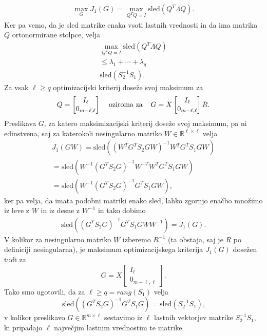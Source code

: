 \documentclass[mat1]{article}
\theoremstyle{definition}
\begin{document}
\begin{align*}
\max_G J_1(G) = \max_{Q^TQ=I} \text{sled} \left(Q^T \Lambda Q \right)
\text{.}
\end{align*}
Ker pa vemo, da je sled matrike enaka vsoti lastnih vrednosti in da ima matrika $Q$ ortonormirane stolpce, velja
\begin{align*}
\max_{Q^TQ=I} \text{sled} \left(Q^T \Lambda Q \right)
\\
\leq
\lambda_1 + \cdots + \lambda_q
\\
\text{sled} \left( S_2^{-1} S_1 \right)
\text{.}
\end{align*}
Za vsak $\ell \geq q$ optimizacijski kriterij doseže svoj maksimum za 
$$ Q = 
\begin{bmatrix}
I_{\ell} \\
0_{m-\ell, \ell}
\end{bmatrix}
\hspace{4mm}
\text{oziroma za}
\hspace{4mm}
G = 
X 
\begin{bmatrix}
I_{\ell} \\
0_{m-\ell, \ell}
\end{bmatrix}
R
\text{.}
$$
Preslikava $G$, za katero maksimizacijski kriterij doseže svoj maksimum, pa ni edinstvena, saj za katerokoli nesingularno matriko $W \in \mathbb{R}^{\ell \times \ell}$ velja
\begin{align*}
J_1(GW) = 
\text{sled}\left( (W^T G^T S_2 G W)^{-1} W^T G^T S_1 GW \right)
\\
=
\text{sled}\left( W^{-1}(G^T S_2 G)^{-1}W^{-T} W^T G^T S_1 GW \right)
\\
=
\text{sled}\left( W^{-1}(G^T S_2 G)^{-1}G^T S_1 GW \right)
\text{,}
\end{align*}
ker pa velja, da imata podobni matriki enako sled, lahko zgornjo enačbo množimo iz leve z $W$ in iz desne z $W^{-1}$ in tako dobimo
\begin{align*}
\text{sled}\left((G^T S_2 G)^{-1} G^T S_1 GW W^{-1} \right)
=
J_1(G)
\text{.}
\end{align*}
V kolikor za nesingularno matriko $W$ izberemo $R^{-1}$ (ta obstaja, saj je $R$ po definiciji nesingularna), je maksimum optimizacijskega kriterija $J_1(G)$ dosežen tudi za 
$$ G = X 
\begin{bmatrix}
I_{\ell} \\
0_{m-\ell, \ell}
\end{bmatrix}
\text{.}
$$
Tako smo ugotovili, da za $\ell \geq q = rang(S_1)$ velja
$$
\text{sled} \left( (G^T S_2 G)^{-1} G^T S_1 G \right)
=
\text{sled} \left( S_2^{-1} S_1 \right)
\text{,}
$$
v kolikor preslikavo $G \in \mathbb{R}^{m \times \ell}$
sestavimo iz $\ell$ lastnih vektorjev matrike $S_2^{-1} S_1$, ki pripadajo $\ell$ največjim lastnim vrednostim te matrike.
\end{document}
